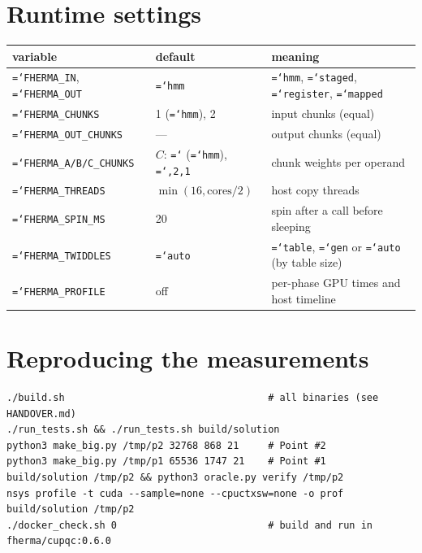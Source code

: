 \documentclass[11pt,a4paper]{article}
\newcommand{\code}[1]{\texttt{\hyphenchar\font=`\-\relax #1}}
\begin{document}
\appendix
\section{Runtime settings}\label{app:settings}
\begin{center}
\begin{tabular}{lll}
\toprule
variable & default & meaning \\
\midrule
\code{FHERMA\_IN}, \code{FHERMA\_OUT} & \code{hmm} & \code{hmm}, \code{staged}, \code{register}, \code{mapped} \\
\code{FHERMA\_CHUNKS} & 1 (\code{hmm}), 2 & input chunks (equal) \\
\code{FHERMA\_OUT\_CHUNKS} & --- & output chunks (equal) \\
\code{FHERMA\_A/B/C\_CHUNKS} & $C$: \code{1} (\code{hmm}), \code{1,2,1} & chunk weights per operand \\
\code{FHERMA\_THREADS} & $\min(16, \text{cores}/2)$ & host copy threads \\
\code{FHERMA\_SPIN\_MS} & 20 & spin after a call before sleeping \\
\code{FHERMA\_TWIDDLES} & \code{auto} & \code{table}, \code{gen} or \code{auto} (by table size) \\
\code{FHERMA\_PROFILE} & off & per-phase GPU times and host timeline \\
\bottomrule
\end{tabular}
\end{center}

\section{Reproducing the measurements}
\begin{lstlisting}
./build.sh                                   # all binaries (see HANDOVER.md)
./run_tests.sh && ./run_tests.sh build/solution
python3 make_big.py /tmp/p2 32768 868 21     # Point #2
python3 make_big.py /tmp/p1 65536 1747 21    # Point #1
build/solution /tmp/p2 && python3 oracle.py verify /tmp/p2
nsys profile -t cuda --sample=none --cpuctxsw=none -o prof build/solution /tmp/p2
./docker_check.sh 0                          # build and run in fherma/cupqc:0.6.0
\end{lstlisting}
\end{document}
